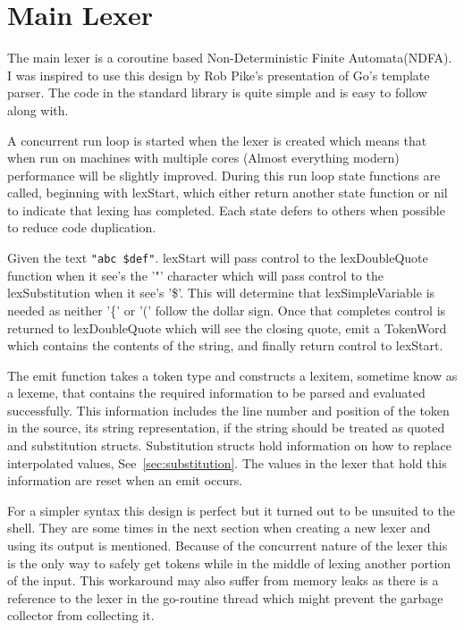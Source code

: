 \section{Main Lexer}
The main lexer is a coroutine based Non-Deterministic Finite Automata(NDFA).
I was inspired to use this design by Rob Pike's presentation of Go's template parser\cite{PIKE-LEXING-VIDEO}.
The code in the standard library is quite simple and is easy to follow along with.

A concurrent run loop is started when the lexer is created which means that when run on machines with multiple cores (Almost everything modern) performance will be slightly improved.
During this run loop state functions are called, beginning with lexStart, which either return another state function or nil to indicate that lexing has completed. 
Each state defers to others when possible to reduce code duplication.

Given the text \verb!"abc $def"!. lexStart will pass control to the lexDoubleQuote function when it see's the '"' character which will pass control to the lexSubstitution when it see's '\$'.
This will determine that lexSimpleVariable is needed as neither '\{' or '(' follow the dollar sign.
Once that completes control is returned to lexDoubleQuote which will see the closing quote, emit a TokenWord which contains the contents of the string, and finally return control to lexStart.

The emit function takes a token type and constructs a lexitem, sometime know as a lexeme, that contains the required information to be parsed and evaluated successfully.
This information includes the line number and position of the token in the source, its string representation, if the string should be treated as quoted and substitution structs.
Substitution structs hold information on how to replace interpolated values, See~\ref{sec:substitution}.
The values in the lexer that hold this information are reset when an emit occurs.

For a simpler syntax this design is perfect but it turned out to be unsuited to the shell.
They are some times in the next section when creating a new lexer and using its output is mentioned.
Because of the concurrent nature of the lexer this is the only way to safely get tokens while in the middle of lexing another portion of the input.
This workaround may also suffer from memory leaks as there is a reference to the lexer in the go-routine thread which might prevent the garbage collector from collecting it.

